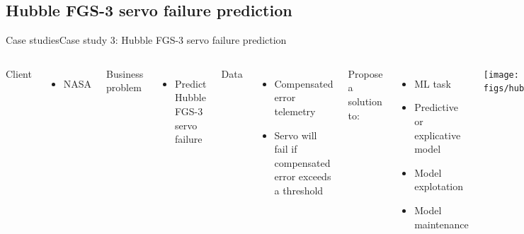 \documentclass[10pt,compress]{beamer} %
\begin{document}
\subsection{Hubble FGS-3 servo failure prediction}
\begin{frame}{Case studies}{Case study 3: Hubble FGS-3 servo failure prediction}
    \begin{columns}
	   \small{
		Client
		\begin{itemize}
			\item NASA
		\end{itemize}
		Business problem
		\begin{itemize}
			\item Predict Hubble FGS-3 servo failure
		\end{itemize}
		Data
		\begin{itemize}
			\item Compensated error telemetry 
			\item Servo will fail if compensated error exceeds a threshold
		\end{itemize}
		Propose a solution to:
		\begin{itemize}
			\item ML task
			\item Predictive or explicative model
			\item Model explotation
			\item Model maintenance
		\end{itemize}
		}
			\texttt{[image: figs/hubble.png]}

			\tiny \centering \href{https://ti.arc.nasa.gov/m/groups/machinelearningworkshop2017/MLW2017_slides/presentationsPDF/Hamed-Valizadegan.pdf}{(Source of this study case)}
    \end{columns}
\end{frame}
\end{document}
